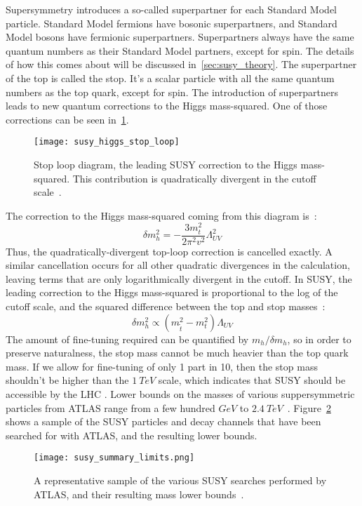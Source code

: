 Supersymmetry introduces a so-called superpartner for each Standard Model particle.
Standard Model fermions have bosonic superpartners, and Standard Model bosons have fermionic superpartners.
Superpartners always have the same quantum numbers as their Standard Model partners, except for spin.
The details of how this comes about will be discussed in~\ref{sec:susy_theory}.
The superpartner of the top is called the stop.
It's a scalar particle with all the same quantum numbers as the top quark, except for spin.
The introduction of superpartners leads to new quantum corrections to the Higgs mass-squared.
One of those corrections can be seen in~\ref{fig:susy_stop_loop}.
\begin{figure}[!ht]
    \centering
\texttt{[image: susy\_higgs\_stop\_loop]}
\caption{Stop loop diagram, the leading SUSY correction to the Higgs mass-squared. This contribution is quadratically divergent in the cutoff scale~\cite{susy-primer-1998}.}
\label{fig:susy_stop_loop}
\end{figure}
The correction to the Higgs mass-squared coming from this diagram is~\cite{susy-primer-1998}:
\begin{equation}\label{eq:higgs_stop_correction}
    \delta m_h^2 = -\frac{3m_t^2}{2\pi^2 v^2}\Lambda_{UV}^2
\end{equation}
Thus, the quadratically-divergent top-loop correction is cancelled exactly.
A similar cancellation occurs for all other quadratic divergences in the calculation, leaving terms that are only logarithmically divergent in the cutoff.
In SUSY, the leading correction to the Higgs mass-squared is proportional to the log of the cutoff scale,
and the squared difference between the top and stop masses~\cite{susy-pheno-2000}:
\begin{equation}\label{eq:susy_higgs_correction}
    \delta m_h^2 \propto \left(m_{\tilde{t}}^2 - m_t^2\right)  \Lambda_{UV}
\end{equation}
The amount of fine-tuning required can be quantified by $m_h / \delta m_h $, so in order to preserve naturalness, the stop mass cannot be much heavier than the top quark mass.
If we allow for fine-tuning of only 1 part in 10, then the stop mass shouldn't be higher than the $1~TeV$ scale, which indicates that SUSY should be accessible by the LHC .
Lower bounds on the masses of various suppersymmetric particles from ATLAS range from a few hundred $GeV$ to $2.4~TeV$~\cite{susy-summary-public}.
Figure~\ref{fig:susy_limits_summary} shows a sample of the SUSY particles and decay channels that have been searched for with ATLAS, and the resulting lower bounds.
\begin{figure}[!ht]
    \centering
\texttt{[image: susy\_summary\_limits.png]}
\caption{A representative sample of the various SUSY searches performed by ATLAS, and their resulting mass lower bounds~\cite{susy-summary-public}.}
\label{fig:susy_limits_summary}
\end{figure}

